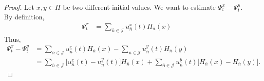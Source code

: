 \documentclass[review, onefignum, onetabnum]{siamart171218}
\begin{document}
\begin{proof}
Let $x,y\in H$ be two different initial values. We want to estimate
$\Psi_t^x-\Psi_t^y$. By definition,
\begin{align}
\Psi_t^x&=\sum_{\bar n\in \mathcal{J}} u_{\bar n}^x(t)H_{\bar n}(x)
\end{align}
Thus,
%
\begin{equation}
    \label{s3.4}
    \begin{aligned}
        \Psi_t^x-\Psi_t^y
        &=
            \sum_{\bar n\in \mathcal{J}}
                u_{\bar n}^x(t)H_{\bar n}(x)
            -
            \sum_{\bar n\in \mathcal{J}}
                u_{\bar n}^y(t)H_{\bar n}(y)
       \\
        &=
            \sum_{\bar n\in \mathcal{J}}
                \Big[ u_{\bar n}^x(t )- u_{\bar n}^y(t)
                \Big]H_{\bar n}(x)
            +
            \sum_{\bar n\in \mathcal{J}}
                u_{\bar n}^y(t)
                \Big[
                    H_{\bar n}(x) - H_{\bar n}(y)
                \Big].
    \end{aligned}
\end{equation}


\end{proof}
\end{document}
